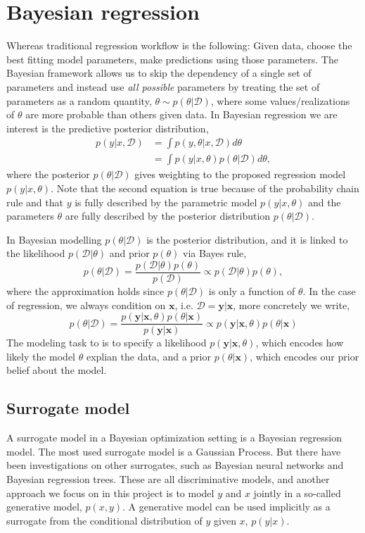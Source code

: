 \section{Bayesian regression}
Whereas traditional regression workflow is the following: Given data, choose the best fitting model
parameters, make predictions using those parameters. The Bayesian framework allows us to skip the
dependency of a single set of parameters and instead use \textit{all possible} parameters by treating the set
of parameters as a random quantity, $\theta \sim p(\theta|\mathcal{D})$, where some values/realizations of $\theta$ are more
probable than others given data. In Bayesian regression we are interest is the predictive posterior distribution,  
\begin{align}\label{Predictive2}
    p(y|x, \mathcal{D}) &= \int p(y,\theta|x, \mathcal{D}) d\theta\\
    &= \int p(y|x,\theta)p(\theta|\mathcal{D}) d\theta,
\end{align}
where the posterior $p(\theta|\mathcal{D})$ gives weighting to the proposed regression model
$p(y|x,\theta)$. Note that the second equation is true because of the probability chain rule and
that $y$ is fully described by the parametric model $p(y|x,\theta)$ and the parameters $\theta$ are
fully described by the posterior distribution $p(\theta|\mathcal{D})$.
\begin{testexample2}
    In Bayesian modelling $p(\theta|\mathcal{D})$ is the posterior distribution, and it is linked
     to the likelihood $p(\mathcal{D}|\theta)$ and prior $p(\theta)$ via Bayes rule,
    $$p(\theta|\mathcal{D}) = \frac{p(\mathcal{D}|\theta)p(\theta)}{p(\mathcal{D})} \propto p(\mathcal{D}|\theta)p(\theta),$$
    where the approximation holds since $p(\theta|\mathcal{D})$ is only a function of $\theta$. 
    In the case of regression, we always condition on $\textbf{x}$, i.e. $\mathcal{D} = \textbf{y}|\textbf{x}$, 
    more concretely we write, 
    $$p(\theta| \mathcal{D}) = \frac{p(\textbf{y}|\textbf{x}, \theta)p(\theta|
    \textbf{x})}{p(\textbf{y}|\textbf{x})} \propto p(\textbf{y}|\textbf{x}, \theta)p(\theta| \textbf{x})$$
    The modeling task to is to specify a likelihood $p(\textbf{y}|\textbf{x},\theta)$, which encodes how likely the model $\theta$
    explian the data, and a prior $p(\theta|\textbf{x})$, which encodes our prior belief about the model. 
\end{testexample2}

\subsection{Surrogate model}
A surrogate model in a Bayesian optimization setting is a Bayesian regression model. The most
used surrogate model is a Gaussian Process. But there have been investigations on other 
surrogates, such as Bayesian neural networks and Bayesian regression trees. These are all
discriminative models, and another approach we focus on in this project is to model $y$ and
$x$ jointly in a so-called generative model, $p(x,y)$. A generative model can be used implicitly
as a surrogate from the conditional distribution of $y$ given $x$, $p(y|x)$.

